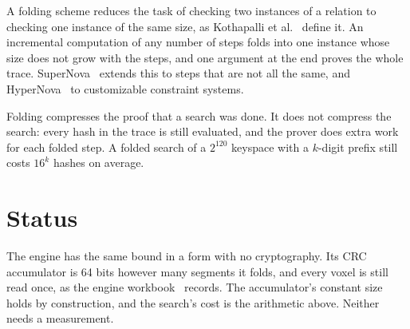A folding scheme reduces the task of checking two instances of a relation to checking one instance of the same size, as Kothapalli et al.~\cite{src:Nova} define it. An incremental computation of any number of steps folds into one instance whose size does not grow with the steps, and one argument at the end proves the whole trace. SuperNova~\cite{src:SuperNova} extends this to steps that are not all the same, and HyperNova~\cite{src:HyperNova} to customizable constraint systems.

Folding compresses the proof that a search was done. It does not compress the search: every hash in the trace is still evaluated, and the prover does extra work for each folded step. A folded search of a \(2^{120}\) keyspace with a \(k\)-digit prefix still costs \(16^k\) hashes on average.

\section{\texorpdfstring{Status}{Status}}

The engine has the same bound in a form with no cryptography. Its CRC accumulator is 64 bits however many segments it folds, and every voxel is still read once, as the engine workbook~\cite{src:Quigg-engine-workbook} records. The accumulator's constant size holds by construction, and the search's cost is the arithmetic above. Neither needs a measurement.
